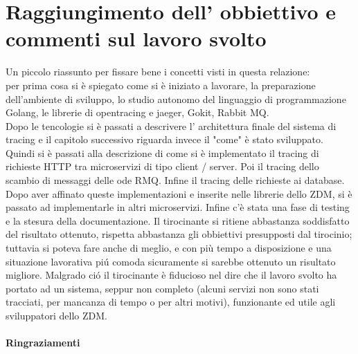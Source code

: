 \documentclass[a4paper,12pt,titlepage,italian,openany]{report}
\begin{document}
\section{Raggiungimento dell' obbiettivo e commenti sul lavoro svolto}
Un piccolo riassunto per fissare bene i concetti visti in questa relazione:\\
per prima cosa si è spiegato come si è iniziato a lavorare, la preparazione dell'ambiente di sviluppo, lo studio autonomo del linguaggio di programmazione 
Golang, le librerie di opentracing\cite{opentracing:1} e jaeger\cite{jaeger:1}, Gokit, Rabbit MQ. \\
Dopo le tencologie si è passati a descrivere l' architettura finale del sistema di tracing e il capitolo successivo riguarda invece il "come" è stato sviluppato. 
Quindi si è passati alla descrizione di come si è implementato il tracing
di richieste HTTP tra microservizi di tipo client / server. Poi il tracing dello scambio di messaggi delle ode RMQ\cite{rabbit:1}. Infine  il tracing delle richieste ai database.
Dopo aver affinato queste implementazioni e inserite nelle librerie dello ZDM\cite{zdm:1}, si è passato ad implementarle in altri microservizi. Infine c'è stata una fase di testing e la stesura della documentazione.
Il tirocinante si ritiene abbastanza soddisfatto del risultato ottenuto, rispetta abbastanza gli obbiettivi presupposti dal tirocinio; tuttavia si poteva fare anche di meglio, e con più tempo a disposizione e una situazione lavorativa piú comoda sicuramente si sarebbe ottenuto un risultato migliore. 
Malgrado ció il tirocinante è fiducioso nel dire che il lavoro svolto ha portato ad un sistema, seppur non completo (alcuni servizi non sono stati tracciati, per mancanza di tempo o per altri motivi), funzionante ed utile agli sviluppatori dello ZDM\cite{zdm:1}.


\appendix



 \newpage

\paragraph{Ringraziamenti}\mbox{}\\[12pt]
\end{document}
